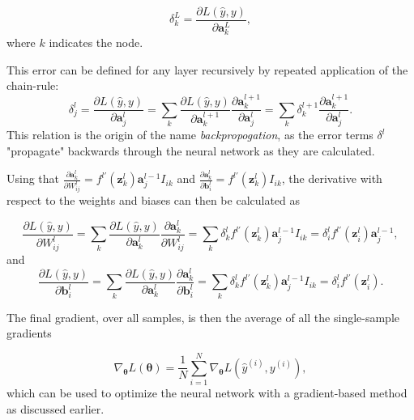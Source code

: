\begin{equation}\label{eq:lastLayerError}
    \delta^L_k = \frac{\partial L(\hat{y}, y)}{\partial \boldsymbol{a}^L_k},
\end{equation}
where $k$ indicates the node.

This error can be defined for any layer recursively by repeated application of the chain-rule:
\begin{equation}\label{eq:error}
    \delta^l_j = \frac{\partial L(\hat{y}, y)}{\partial \boldsymbol{a}^l_j} 
    = \sum_k \frac{\partial L(\hat{y}, y)}{\partial \boldsymbol{a}^{l+1}_k} \frac{\partial \boldsymbol{a}^{l+1}_k}{\partial \boldsymbol{a}^{l}_j}
    = \sum_k \delta^{l+1}_k \frac{\partial \boldsymbol{a}^{l+1}_k}{\partial \boldsymbol{a}^{l}_j}.
\end{equation}
This relation is the origin of the name \emph{backpropogation}, as the error terms $\delta^l$ "propagate" backwards through the neural network as they are calculated.

Using that 
$\frac{\partial \boldsymbol{a}^{l}_k}{\partial W^l_{ij}} = f^{l\prime}(\boldsymbol{z}^{l}_k)\boldsymbol{a}^{l-1}_j I_{ik}$ 
and 
$\frac{\partial \boldsymbol{a}^{l}_k}{\partial \boldsymbol{b}^l_{i}} = f^{l\prime}(\boldsymbol{z}^{l}_k) I_{ik}$, the derivative with respect to the weights and biases can then be calculated as 

\begin{equation}\label{eq:derivweights}
    \frac{\partial L(\hat{y}, y)}{\partial W^l_{ij}} = 
    \sum_k \frac{\partial L(\hat{y}, y)}{\partial \boldsymbol{a}^{l}_k} \frac{\partial \boldsymbol{a}^{l}_k}{\partial W^l_{ij}} = 
    \sum_k \delta^{l}_k f^{l\prime}(\boldsymbol{z}^{l}_k)\boldsymbol{a}^{l-1}_j I_{ik}=
    \delta^{l}_i f^{l\prime}(\boldsymbol{z}^l_i) \boldsymbol{a}^{l-1}_j,
\end{equation}
and
\begin{equation}\label{eq:derivbiases}
    \frac{\partial L(\hat{y}, y)}{\partial \boldsymbol{b}^l_{i}} = 
    \sum_k \frac{\partial L(\hat{y}, y)}{\partial \boldsymbol{a}^{l}_k} \frac{\partial \boldsymbol{a}^{l}_k}{\partial \boldsymbol{b}^l_{i}} = 
    \sum_k \delta^{l}_k f^{l\prime}(\boldsymbol{z}^{l}_k)\boldsymbol{a}^{l-1}_j I_{ik}=
    \delta^{l}_i f^{l\prime}(\boldsymbol{z}^l_i).
\end{equation}

The final gradient, over all samples, is then the average of all the single-sample gradients

\begin{equation}\label{eq:averageGradient}
    \nabla_{\boldsymbol{\theta}} L(\boldsymbol{\theta}) = \frac{1}{N}\sum_{i=1}^N \nabla_{\boldsymbol{\theta}} L(\hat{y}^{(i)}, y^{(i)}),
\end{equation}
which can be used to optimize the neural network with a gradient-based method as discussed earlier.


